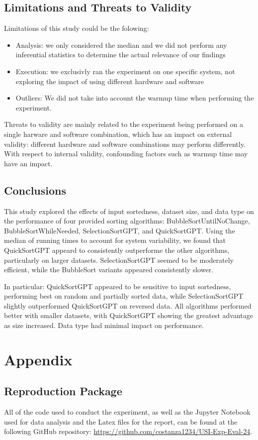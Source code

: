 \documentclass[unicode,11pt,a4paper,oneside,numbers=endperiod,openany]{scrartcl}
\begin{document}
    \subsection{Limitations and Threats to Validity}

    Limitations of this study could be the folowing:
    \begin{itemize}
        \item Analysis: we only considered the median and we did not perform any inferential statistics to determine the actual relevance of our findings
        \item Execution: we exclusivly ran the experiment on one specific system, not exploring the impact of using different hardware and software
        \item Outliers: We did not take into account the warmup time when performing the experiment.
    \end{itemize}

    Threats to validity are mainly related to the experiment being performed on a single harware and software combination, which has an impact on external validity: different hardware and software combinations may perform differently. With respect to internal validity, confounding factors such as warmup time may have an impact.



    \subsection{Conclusions}

    This study explored the effects of input sortedness, dataset size, and data type on the performance of four provided sorting algorithms: BubbleSortUntilNoChange, BubbleSortWhileNeeded, SelectionSortGPT, and QuickSortGPT. Using the median of running times to account for system variability, we found that QuickSortGPT appeard to consistently outperforme the other algorithms, particularly on larger datasets. SelectionSortGPT seemed to be moderately efficient, while the BubbleSort variants appeared consistently slower.

    In particular: QuickSortGPT appeared to be sensitive to input sortedness, performing best on random and partially sorted data, while SelectionSortGPT slightly outperformed QuickSortGPT on reversed data. All algorithms performed better with smaller datasets, with QuickSortGPT showing the greatest advantage as size increased. Data type had minimal impact on performance.


\section{Appendix}

    \subsection{Reproduction Package}
    All of the code used to conduct the experiment, as well as the Jupyter Notebook used for data analysis and the Latex files for the report, can be found at the following GitHub repository: \url{https://github.com/costanza1234/USI-Exp-Eval-24}.
\end{document}
